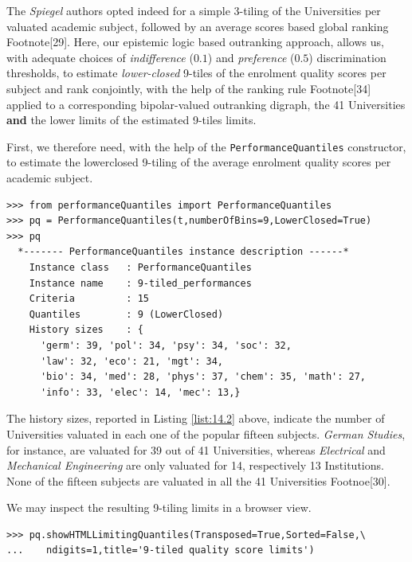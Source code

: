 The \emph{Spiegel} authors opted indeed for a simple 3-tiling of the Universities per valuated academic subject, followed by an average \Borda scores based global ranking Footnote[29]. Here, our epistemic logic based outranking approach, allows us, with adequate choices of \emph{indifference} ($0.1$) and \emph{preference} ($0.5$) discrimination thresholds, to estimate \emph{lower-closed} 9-tiles of the enrolment quality scores per subject and rank conjointly, with the help of the \Copeland ranking rule Footnote[34] applied to a corresponding bipolar-valued outranking digraph, the 41 Universities \textbf{and} the lower limits of the estimated 9-tiles limits.

First, we therefore need, with the help of the \texttt{PerformanceQuantiles} constructor, to estimate the lowerclosed 9-tiling of the average enrolment quality scores per academic subject.

\begin{lstlisting}[caption={Computing 9-tiles of the enrolment quality scores per subject},label=list:14.2]
>>> from performanceQuantiles import PerformanceQuantiles
>>> pq = PerformanceQuantiles(t,numberOfBins=9,LowerClosed=True)
>>> pq
  *------- PerformanceQuantiles instance description ------*
    Instance class   : PerformanceQuantiles
    Instance name    : 9-tiled_performances
    Criteria         : 15
    Quantiles        : 9 (LowerClosed)
    History sizes    : {
      'germ': 39, 'pol': 34, 'psy': 34, 'soc': 32,
      'law': 32, 'eco': 21, 'mgt': 34,
      'bio': 34, 'med': 28, 'phys': 37, 'chem': 35, 'math': 27,
      'info': 33, 'elec': 14, 'mec': 13,}
\end{lstlisting}

The history sizes, reported in Listing \ref{list:14.2} above, indicate the number of Universities valuated in each one of the popular fifteen subjects. \emph{German Studies}, for instance, are valuated for 39 out of 41 Universities, whereas \emph{Electrical} and \emph{Mechanical Engineering} are only valuated for 14, respectively 13 Institutions. None of the fifteen subjects are valuated in all the 41 Universities Footnoe[30]. 

We may inspect the resulting 9-tiling limits in a browser view.

\begin{lstlisting}
>>> pq.showHTMLLimitingQuantiles(Transposed=True,Sorted=False,\
...	   ndigits=1,title='9-tiled quality score limits')
\end{lstlisting}

